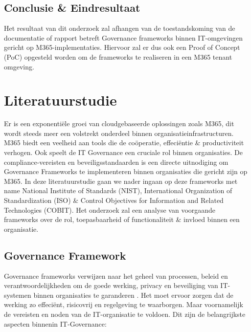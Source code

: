 \subsection{Conclusie \& Eindresultaat}
Het resultaat van dit onderzoek zal afhangen van de toestandskoming van de documentatie of rapport betreft Governance frameworks binnen IT-omgevingen gericht op M365-implementaties. Hiervoor zal er dus ook een Proof of Concept (PoC) opgesteld worden om de frameworks te realiseren in een M365 tenant omgeving.



\section{Literatuurstudie}%
\label{sec:Literatuurstudie}

Er is een exponentiële groei van cloudgebaseerde oplossingen zoals M365, dit wordt steeds meer een volstrekt onderdeel binnen organisatieinfrastructuren. M365 biedt een veelheid aan tools die de coöperatie, effeciëntie \& productiviteit verhogen. Ook speelt de IT Governance een cruciale rol binnen organisaties. 
De compliance-vereisten en beveiligsstandaarden is een directe uitnodiging om Governance Frameworks te implementeren binnen organisaties die gericht zijn op M365.
In deze literatuurstudie gaan we nader ingaan op deze frameworks met name National Institute of Standards (NIST), International Organization of Standardization (ISO) \& Control Objectives for Information and Related Technologies (COBIT). Het onderzoek zal een analyse van voorgaande frameworks over de rol, toepasbaarheid of functionaliteit \& invloed binnen een organisatie.

\subsection{Governance Framework}
Governance frameworks verwijzen naar het geheel van processen, beleid en verantwoordelijkheden om de goede werking, privacy en beveiliging van IT-systemen binnen organisaties te garanderen \autocite{George2014}. Het moet ervoor zorgen dat de werking zo effeciënt, risicovrij en regelgeving te waarborgen. Maar voornamelijk de vereisten en noden van de IT-organisatie te voldoen. Dit zijn de belangrijkste aspecten binnenin IT-Governance:

